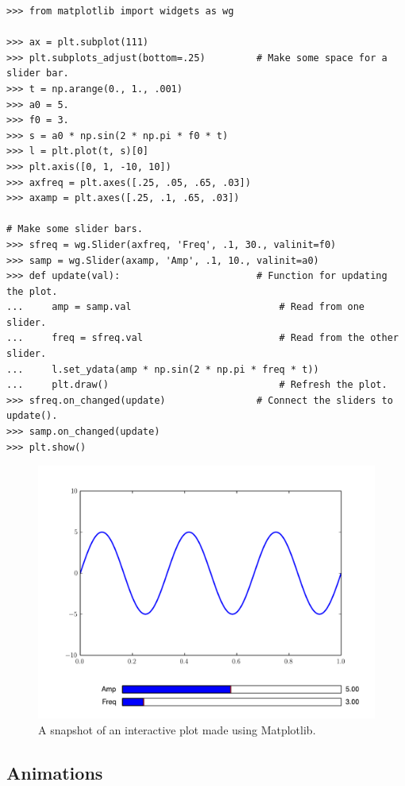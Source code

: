 \begin{lstlisting} 
>>> from matplotlib import widgets as wg 

>>> ax = plt.subplot(111)
>>> plt.subplots_adjust(bottom=.25)         # Make some space for a slider bar.
>>> t = np.arange(0., 1., .001)     
>>> a0 = 5. 
>>> f0 = 3. 
>>> s = a0 * np.sin(2 * np.pi * f0 * t) 
>>> l = plt.plot(t, s)[0]
>>> plt.axis([0, 1, -10, 10]) 
>>> axfreq = plt.axes([.25, .05, .65, .03]) 
>>> axamp = plt.axes([.25, .1, .65, .03]) 

# Make some slider bars.
>>> sfreq = wg.Slider(axfreq, 'Freq', .1, 30., valinit=f0) 
>>> samp = wg.Slider(axamp, 'Amp', .1, 10., valinit=a0) 
>>> def update(val):                        # Function for updating the plot.
...     amp = samp.val                          # Read from one slider.
...     freq = sfreq.val                        # Read from the other slider.
...     l.set_ydata(amp * np.sin(2 * np.pi * freq * t)) 
...     plt.draw()                              # Refresh the plot.
>>> sfreq.on_changed(update)                # Connect the sliders to update().
>>> samp.on_changed(update)
>>> plt.show() 
\end{lstlisting}

\begin{figure}[H]
\includegraphics[width=.7\textwidth]{interact.pdf}
\caption{A snapshot of an interactive plot made using Matplotlib.}
\label{mpl:interact} \end{figure}


\subsection*{Animations} %

